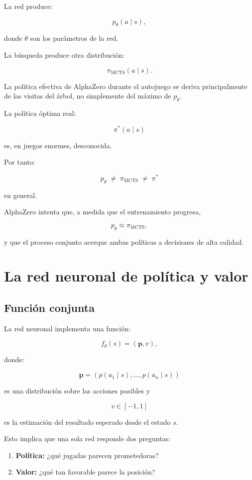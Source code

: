 \documentclass[11pt,a4paper]{article}
\begin{document}
La red produce:

\[
p_\theta(a\mid s),
\]

donde \(\theta\) son los parámetros de la red.

La búsqueda produce otra distribución:

\[
\pi_{\mathrm{MCTS}}(a\mid s).
\]

La política efectiva de AlphaZero durante el autojuego se deriva principalmente de las visitas del árbol, no simplemente del máximo de \(p_\theta\).

La política óptima real:

\[
\pi^*(a\mid s)
\]

es, en juegos enormes, desconocida.

Por tanto:

\[
p_\theta
\;\neq\;
\pi_{\mathrm{MCTS}}
\;\neq\;
\pi^*
\]

en general.

AlphaZero intenta que, a medida que el entrenamiento progresa,

\[
p_\theta \approx \pi_{\mathrm{MCTS}},
\]

y que el proceso conjunto acerque ambas políticas a decisiones de alta calidad.

\section{La red neuronal de política y valor}

\subsection{Función conjunta}

La red neuronal implementa una función:

\[
f_\theta(s) = (\bm{p}, v),
\]

donde:

\[
\bm{p} = \left(p(a_1\mid s),\ldots,p(a_n\mid s)\right)
\]

es una distribución sobre las acciones posibles y

\[
v \in [-1,1]
\]

es la estimación del resultado esperado desde el estado \(s\).

Esto implica que una sola red responde dos preguntas:

\begin{enumerate}
    \item \textbf{Política:} ¿qué jugadas parecen prometedoras?
    \item \textbf{Valor:} ¿qué tan favorable parece la posición?
\end{enumerate}
\end{document}
